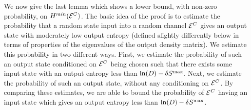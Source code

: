 \documentclass[aps,prl,amsmath,amssymb,amsfonts,superscriptaddress,floatfix]{revtex4}
\newcommand{\dSm}{\delta S^{\rm max}}
\newcommand{\conc}{{\cal E}^C}
\begin{document}
We now give the last lemma which shows a lower bound, with non-zero probability,
on $H^{min}(\conc)$.  The basic idea of the proof is to estimate
the probability that a random state
input into a random channel $\conc$ gives an output state with moderately
low output entropy (defined slightly differently below in terms
of properties of the eigenvalues of the output density matrix).  We estimate
this probability in two different ways.  First, we estimate the probability
of such an output state conditioned on $\conc$ being chosen such
that there exists some input state
with an output entropy less than $\ln(D)-\dSm$.  Next, we
estimate the probability of such an output state, without any conditioning
on $\conc$.
By comparing these estimates, we are able to bound the probability of $\conc$
having an input state which gives an output entropy less than $\ln(D)-\dSm$.
\end{document}
